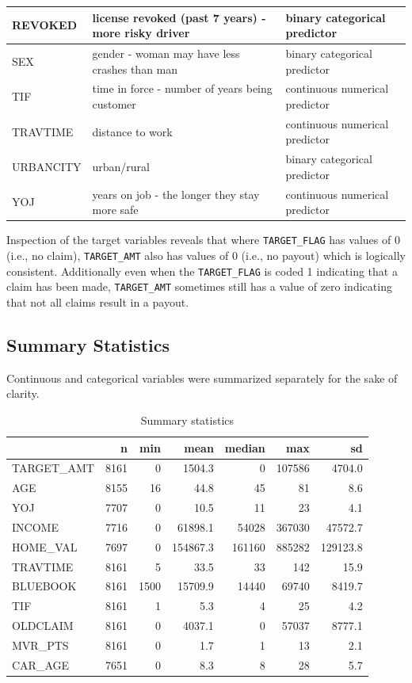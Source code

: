 \documentclass[]{article}
\begin{document}
\begin{table}
\begin{tabular}[t]{l|l|l}
\hline
REVOKED & license revoked (past 7 years) - more risky driver & binary categorical predictor\\
\hline
SEX & gender - woman may have less crashes than man & binary categorical predictor\\
\hline
TIF & time in force - number of years being customer & continuous numerical predictor\\
\hline
TRAVTIME & distance to work & continuous numerical predictor\\
\hline
URBANCITY & urban/rural & binary categorical predictor\\
\hline
YOJ & years on job - the longer they stay more safe & continuous numerical predictor\\
\hline
\end{tabular}
\end{table}

Inspection of the target variables reveals that where
\texttt{TARGET\_FLAG} has values of 0 (i.e., no claim),
\texttt{TARGET\_AMT} also has values of 0 (i.e., no payout) which is
logically consistent. Additionally even when the \texttt{TARGET\_FLAG}
is coded 1 indicating that a claim has been made, \texttt{TARGET\_AMT}
sometimes still has a value of zero indicating that not all claims
result in a payout.

\subsection{Summary Statistics}\label{summary-statistics}

Continuous and categorical variables were summarized separately for the
sake of clarity.

\begin{table}

\caption{\label{tab:t2}Summary statistics}
\centering
\begin{tabular}[t]{l|r|r|r|r|r|r}
\hline
  & n & min & mean & median & max & sd\\
\hline
TARGET\_AMT & 8161 & 0 & 1504.3 & 0 & 107586 & 4704.0\\
\hline
AGE & 8155 & 16 & 44.8 & 45 & 81 & 8.6\\
\hline
YOJ & 7707 & 0 & 10.5 & 11 & 23 & 4.1\\
\hline
INCOME & 7716 & 0 & 61898.1 & 54028 & 367030 & 47572.7\\
\hline
HOME\_VAL & 7697 & 0 & 154867.3 & 161160 & 885282 & 129123.8\\
\hline
TRAVTIME & 8161 & 5 & 33.5 & 33 & 142 & 15.9\\
\hline
BLUEBOOK & 8161 & 1500 & 15709.9 & 14440 & 69740 & 8419.7\\
\hline
TIF & 8161 & 1 & 5.3 & 4 & 25 & 4.2\\
\hline
OLDCLAIM & 8161 & 0 & 4037.1 & 0 & 57037 & 8777.1\\
\hline
MVR\_PTS & 8161 & 0 & 1.7 & 1 & 13 & 2.1\\
\hline
CAR\_AGE & 7651 & 0 & 8.3 & 8 & 28 & 5.7\\
\hline
\end{tabular}
\end{table}
\end{document}
